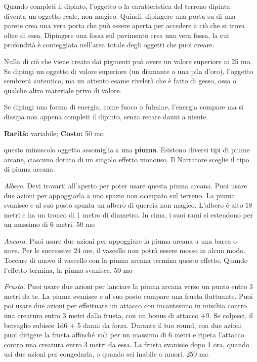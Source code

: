\begin{multicols}{2}
Quando completi il dipinto, l'oggetto o la caratteristica del terreno dipinta diventa un oggetto reale, non magico. Quindi, dipingere una porta su di una parete crea una vera porta che può essere aperta per accedere a ciò che si trova oltre di essa. Dipingere una fossa sul pavimento crea una vera fossa, la cui profondità è conteggiata nell'area totale degli oggetti che puoi creare.

Nulla di ciò che viene creato dai pigmenti può avere un valore superiore ai 25 mo. Se dipingi un oggetto di valore superiore (un diamante o una pila d'oro), l'oggetto sembrerà autentico, ma un attento esame rivelerà che è fatto di gesso, ossa o qualche altro materiale privo di valore.

Se dipingi una forma di energia, come fuoco o fulmine, l'energia compare ma si dissipa non appena completi il dipinto, senza recare danni a niente.


\textbf{Rarità:} variabile; \textbf{Costo:} 50 mo

questo minuscolo oggetto assomiglia a una \textbf{piuma}. Esistono diversi tipi di piume arcane, ciascuno dotato di un singolo effetto monouso. Il Narratore sceglie il tipo di piuma arcana.

\emph{Albero}. Devi trovarti all'aperto per poter usare questa piuma arcana. Puoi usare due azioni per appoggiarla a uno spazio non occupato sul terreno. La piuma svanisce e al suo posto spunta un albero di quercia non magico. L'albero è alto 18 metri e ha un tronco di 1 metro di diametro. In cima, i suoi rami si estendono per un massimo di 6 metri. 50 mo

\emph{Ancora}. Puoi usare due azioni per appoggiare la piuma arcana a una barca o nave. Per le successive 24 ore, il vascello non potrà essere mosso in alcun modo. Toccare di nuovo il vascello con la piuma arcana termina questo effetto. Quando l'effetto termina, la piuma svanisce. 50 mo

\emph{Frusta}. Puoi usare due azioni per lanciare la piuma arcana verso un punto entro 3 metri da te. La piuma svanisce e al suo posto compare una frusta fluttuante. Puoi poi usare due azioni per effettuare un attacco con incantesimo in mischia contro una creatura entro 3 metri dalla frusta, con un bonus di attacco +9. Se colpisci, il bersaglio subisce 1d6 + 5 danni da forza. Durante il tuo round, con due azioni puoi dirigere la frusta affinché voli per un massimo di 6 metri e ripeta l'attacco contro una creatura entro 3 metri da essa. La frusta svanisce dopo 1 ora, quando usi due azioni per congedarla, o quando sei inabile o muori. 250 mo


\end{multicols}

